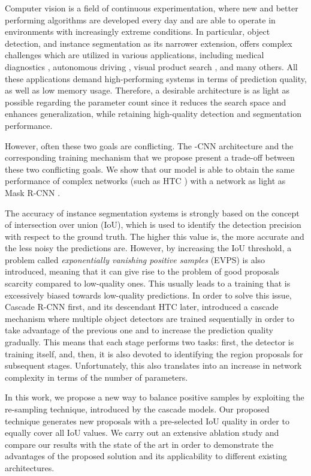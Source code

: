 \documentclass[runningheads, orivec]{llncs}
\begin{document}
Computer vision is a field of continuous experimentation, where new and better performing algorithms are developed every day and are able to operate in environments with increasingly extreme conditions.
In particular, object detection, and instance segmentation as its narrower extension, offers complex challenges which are utilized in various applications, including medical diagnostics \cite{chen2017dcan}, autonomous driving \cite{huang2019robust}, visual product search \cite{liu2015matching}, and many others.
All these applications demand high-performing systems in terms of prediction quality, as well as low memory usage.
Therefore, a desirable architecture is as light as possible regarding the parameter count since it reduces the search space and enhances generalization, while retaining high-quality detection and segmentation performance.

However, often these two goals are conflicting.
The -CNN architecture and the corresponding training mechanism that we propose present a trade-off between these two conflicting goals.
We show that our model is able to obtain the same performance of complex networks (such as HTC \cite{chen2019hybrid}) with a network as light as Mask R-CNN \cite{he2017mask}. 

The accuracy of instance segmentation systems is strongly based on the concept of intersection over union (IoU), which is used to identify the detection precision with respect to the ground truth.
The higher this value is, the more accurate and the less noisy the predictions are.
However, by increasing the IoU threshold, a problem called \emph{exponentially vanishing positive samples} \cite{Cai_2018_CVPR} (EVPS) is also introduced, meaning that it can give rise to the problem of good proposals scarcity compared to low-quality ones.
This usually leads to a training that is excessively biased towards low-quality predictions.
In order to solve this issue, Cascade R-CNN \cite{Cai_2018_CVPR} first, and its descendant HTC later, introduced a cascade mechanism where multiple object detectors are trained sequentially in order to take advantage of the previous one and to increase the prediction quality gradually.
This means that each stage performs two tasks: first, the detector is training itself, and, then, it is also devoted to identifying the region proposals for subsequent stages.
Unfortunately, this also translates into an increase in network complexity in terms of the number of parameters.

In this work, we propose a new way to balance positive samples by exploiting the re-sampling technique, introduced by the cascade models.
Our proposed technique generates new proposals with a pre-selected IoU quality in order to equally cover all IoU values.
We carry out an extensive ablation study and compare our results with the state of the art in order to demonstrate the advantages of the proposed solution and its applicability to different existing architectures. 
\end{document}
